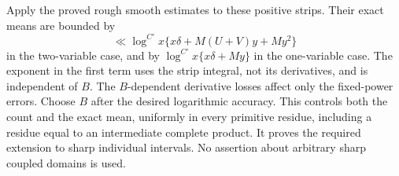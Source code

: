 Apply the proved rough smooth estimates to these positive strips.
Their exact means are bounded by
\[
 \ll\log^{C'}x\{x\delta+M(U+V)y+My^2\}
\]
in the two-variable case, and by
$\log^{C'}x\{x\delta+My\}$ in the one-variable case.
The exponent in the first term uses the strip integral, not its
derivatives, and is independent of $B$.  The $B$-dependent derivative
losses affect only the fixed-power errors.  Choose $B$ after the desired
logarithmic accuracy.  This controls both the count and the exact mean,
uniformly in every primitive residue, including a residue equal to an
intermediate complete product.  It proves the required extension to
sharp individual intervals.  No assertion about arbitrary sharp coupled
domains is used.
